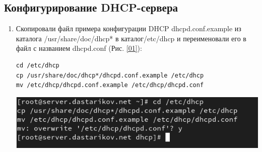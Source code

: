 \subsection{Конфигурирование DHCP-сервера}
\begin{enumerate}
    \item Скопировали файл примера конфигурации DHCP dhcpd.conf.example из каталога /usr/share/doc/dhcp* в каталог/etc/dhcp и переименовали его в файл с названием dhcpd.conf (Рис. \ref{01}):
    \begin{verbatim}
cd /etc/dhcp
cp /usr/share/doc/dhcp*/dhcpd.conf.example /etc/dhcp
mv /etc/dhcp/dhcpd.conf.example /etc/dhcp/dhcpd.conf
    \end{verbatim}

\begin{center}
    \centering
    \includegraphics[width=\textwidth]{../images/image01.png}
    \label{01}
\end{center}


\end{enumerate}
